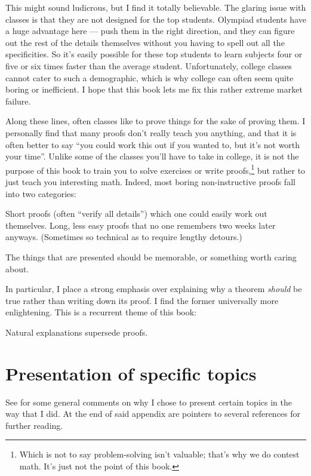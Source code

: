 This might sound ludicrous, but I find it totally believable.
The glaring issue with classes is that they are not designed for the top students.
Olympiad students have a huge advantage here --- push them in the right direction,
and they can figure out the rest of the details themselves
without you having to spell out all the specificities.
So it's easily possible for these top students to learn subjects
four or five or six times faster than the average student.
Unfortunately, college classes cannot cater to such a demographic,
which is why college can often seem quite boring or inefficient.
I hope that this book lets me fix this rather extreme market failure.

Along these lines, often classes like to prove things for the sake of proving them.
I personally find that many proofs don't really teach you anything,
and that it is often better to say ``you could work this out if you wanted to, but it's not worth your time''.
Unlike some of the classes you'll have to take in college,
it is not the purpose of this book to train you to solve exercises or write proofs,\footnote{%
	Which is not to say problem-solving isn't valuable;
	that's why we do contest math.
	It's just not the point of this book.}
but rather to just teach you interesting math.
Indeed, most boring non-instructive proofs fall into two categories:
\begin{enumerate}[(i)]
	\ii Short proofs (often ``verify all details'')
	which one could easily work out themselves.
	\ii Long, less easy proofs that no one remembers
	two weeks later anyways.
	(Sometimes so technical as to require lengthy detours.)
\end{enumerate}
The things that are presented should be memorable, or something worth caring about.

In particular, I place a strong emphasis over explaining why a theorem \emph{should}
be true rather than writing down its proof.
I find the former universally more enlightening.
This is a recurrent theme of this book:
\begin{moral}
	Natural explanations supersede proofs.
\end{moral}

\section*{Presentation of specific topics}
See  for some general comments on why I chose
to present certain topics in the way that I did.
At the end of said appendix are pointers to
several references for further reading.

